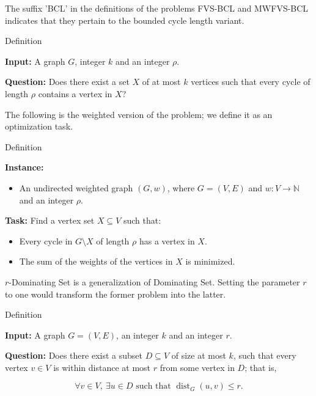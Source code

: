The suffix 'BCL' in the definitions of the problems FVS-BCL and MWFVS-BCL indicates that they 
pertain to the bounded cycle length variant.

\begin{mydefinition}{Definition}
    \label{FVS-BCL}

    \textbf{Input:}
    A graph $G$, integer $k$ and an integer $\rho$.

    \textbf{Question:}
    Does there exist a set $X$ of at most $k$ vertices such that every cycle of length $\rho$ contains a vertex in $X$?

\end{mydefinition}

The following is the weighted version of the problem; we define it as an optimization task.

\begin{mydefinition}{Definition}
    \label{MWFVS-BCL}

    \textbf{Instance:}
    \begin{itemize}[noitemsep, topsep=0pt]
        \item An undirected weighted graph $(G, w)$, where $G = (V, E)$ and $w: V \to \mathbb{N}$ and an integer $\rho$.
    \end{itemize}
    \textbf{Task:}
    Find a vertex set $X \subseteq V$ such that:
    \begin{itemize}[noitemsep, topsep=0pt]
        \item Every cycle in \( G \setminus X \) of length $\rho$ has a vertex in $X$.
        \item The sum of the weights of the vertices in $X$ is minimized.
    \end{itemize}

\end{mydefinition}

$r$-Dominating Set is a generalization of Dominating Set. Setting the parameter $r$ to one would 
transform the former problem into the latter.

\begin{mydefinition}{Definition}
    \label{def:r-DS}

    \textbf{Input:}
    A graph $G = (V, E)$, an integer $k$ and an integer $r$.

    \textbf{Question:}
    Does there exist a subset $D \subseteq V$ of size at most $k$, such that every vertex
    $v \in V$ is within distance at most $r$ from some vertex in $D$; that is,

    \[
    \forall v \in V,\ \exists u \in D \text{ such that } \operatorname{dist}_G(u, v) \leq r.
    \]
\end{mydefinition}

